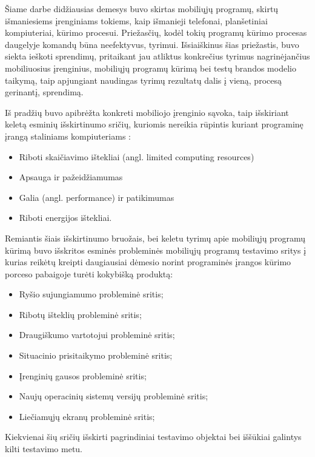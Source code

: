 \documentclass{VUMIFPSkursinis}
\begin{document}
 Šiame darbe didžiausias demesys buvo skirtas mobiliųjų programų, skirtų išmaniesiems įrenginiams tokiems, kaip išmanieji telefonai, planšetiniai kompiuteriai, kūrimo procesui. Priežasčių, kodėl tokių programų kūrimo procesas daugelyje komandų būna neefektyvus, tyrimui. Išsiaiškinus šias priežastis, buvo siekta ieškoti sprendimų, pritaikant jau atliktus konkrečius tyrimus nagrinėjančius mobiliuosius įrenginius, mobiliųjų programų kūrimą bei testų brandos modelio taikymą, taip apjungiant naudingas tyrimų rezultatų dalis į vieną, procesą gerinantį, sprendimą.

Iš pradžių buvo apibrėžta konkreti mobiliojo įrenginio sąvoka, taip išskiriant keletą esminių išskirtinumo sričių, kuriomis nereikia rūpintis kuriant programinę įrangą staliniams kompiuteriams \cite{Satyanarayanan:1996:FCM:248052.248053}:
\begin{itemize}
   \item Riboti skaičiavimo ištekliai (angl. limited computing resources)
   \item Apsauga ir pažeidžiamumas
   \item Galia (angl. performance) ir patikimumas
   \item Riboti energijos ištekliai.
\end{itemize}
Remiantis šiais išskirtinumo bruožais, bei keletu tyrimų apie mobiliųjų programų kūrimą \cite{Muccini:2012:STM:2663608.2663615, 6496451} buvo išskritos esminės probleminės mobiliųjų programų testavimo sritys į kurias reikėtų kreipti daugiausiai dėmesio norint programinės įrangos kūrimo porceso pabaigoje turėti kokybišką produktą:
\begin{itemize}
  \item Ryšio sujungiamumo probleminė sritis;
  \item Ribotų išteklių probleminė sritis;
  \item Draugiškumo vartotojui probleminė sritis;
  \item Situacinio prisitaikymo probleminė sritis;
  \item Įrenginių gausos probleminė sritis;
  \item Naujų operacinių sistemų versijų probleminė sritis;
  \item Liečiamųjų ekranų probleminė sritis;
\end{itemize}
Kiekvienai šių sričių išskirti pagrindiniai testavimo objektai bei iššūkiai galintys kilti testavimo metu.
\end{document}
